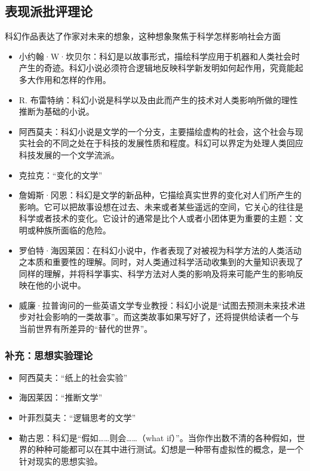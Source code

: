 \documentclass{ctexart}
\begin{document}
\subsection{表现派批评理论}



    科幻作品表达了作家对未来的想象，这种想象聚焦于科学怎样影响社会方面
    \begin{itemize}
        \item 小约翰·W·坎贝尔：科幻是以故事形式，描绘科学应用于机器和人类社会时产生的奇迹。科幻小说必须符合逻辑地反映科学新发明如何起作用，究竟能起多大作用和怎样的作用。
        \item R. 布雷特纳：科幻小说是科学以及由此而产生的技术对人类影响所做的理性推断为基础的小说。
        \item 阿西莫夫：科幻小说是文学的一个分支，主要描绘虚构的社会，这个社会与现实社会的不同之处在于科技的发展性质和程度。科幻可以界定为处理人类回应科技发展的一个文学流派。
        \item 克拉克：“变化的文学”
        \item 詹姆斯·冈恩：科幻是文学的新品种，它描绘真实世界的变化对人们所产生的影响。它可以把故事设想在过去、未来或者某些遥远的空间，它关心的往往是科学或者技术的变化。它设计的通常是比个人或者小团体更为重要的主题：文明或种族所面临的危险。
        \item 罗伯特·海因莱因：在科幻小说中，作者表现了对被视为科学方法的人类活动之本质和重要性的理解。同时，对人类通过科学活动收集到的大量知识表现了同样的理解，并将科学事实、科学方法对人类的影响及将来可能产生的影响反映在他的小说中。
        \item 威廉·拉普询问的一些英语文学专业教授：科幻小说是“试图去预测未来技术进步对社会影响的一类故事”。而这类故事如果写好了，还将提供给读者一个与当前世界有所差异的“替代的世界”。
    \end{itemize}

\subsubsection{补充：思想实验理论}
\begin{itemize}
    \item 阿西莫夫：“纸上的社会实验”
    \item 海因莱因：“推断文学”
    \item 叶菲烈莫夫：“逻辑思考的文学”
    \item 勒古恩：科幻是“假如……则会……（what if）”。当你作出数不清的各种假如，世界的种种可能都可以在其中进行测试。幻想是一种带有虚拟性的概念，是一个针对现实的思想实验。
\end{itemize}
\end{document}
